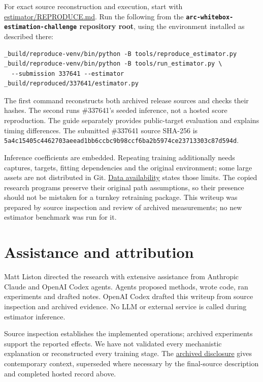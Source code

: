 \documentclass[11pt,letterpaper]{article}
\begin{document}
For exact source reconstruction and execution, start with \href{https://github.com/mattliston/arc-whitebox-estimation-challenge/blob/main/estimator/REPRODUCE.md}{estimator/REPRODUCE.md}. Run the following from the \textbf{\texttt{arc-whitebox-estimation-challenge} repository root}, using the environment installed as described there:

\begin{Verbatim}[fontsize=\small]
_build/reproduce-venv/bin/python -B tools/reproduce_estimator.py
_build/reproduce-venv/bin/python -B tools/run_estimator.py \
  --submission 337641 --estimator _build/reproduced/337641/estimator.py
\end{Verbatim}

The first command reconstructs both archived release sources and checks their hashes. The second runs \#337641's seeded inference, not a hosted score reproduction. The guide separately provides public-target evaluation and explains timing differences. The submitted \#337641 source SHA-256 is \texttt{5a4c1540\allowbreak{}5c446270\allowbreak{}3aeead1b\allowbreak{}b6ccbc9b\allowbreak{}98ccf6ba\allowbreak{}2b5974ce\allowbreak{}23713303\allowbreak{}c87d594d}.

Inference coefficients are embedded. Repeating training additionally needs captures, targets, fitting dependencies and the original environment; some large assets are not distributed in Git. \href{https://github.com/mattliston/arc-whitebox-estimation-challenge/blob/main/data/DATA_INDEX.md}{Data availability} states those limits. The copied research programs preserve their original path assumptions, so their presence should not be mistaken for a turnkey retraining package. This writeup was prepared by source inspection and review of archived measurements; no new estimator benchmark was run for it.

\section{Assistance and attribution}\label{assistance-and-attribution}

Matt Liston directed the research with extensive assistance from Anthropic Claude and OpenAI Codex agents. Agents proposed methods, wrote code, ran experiments and drafted notes. OpenAI Codex drafted this writeup from source inspection and archived evidence. No LLM or external service is called during estimator inference.

Source inspection establishes the implemented operations; archived experiments support the reported effects. We have not validated every mechanistic explanation or reconstructed every training stage. The \href{https://github.com/mattliston/arc-whitebox-estimation-challenge/blob/main/release/common/writeup/WRITEUP_DISCLOSURE_DRAFT_v1.md}{archived disclosure} gives contemporary context, superseded where necessary by the final-source description and completed hosted record above.
\end{document}
